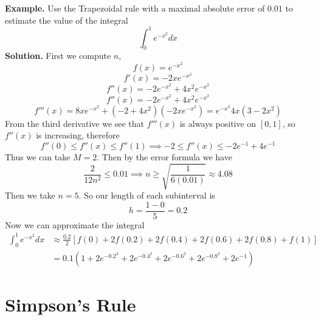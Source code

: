 \documentclass[openany]{report}
\begin{document}
\textbf{Example.} Use the Trapezoidal rule with a maximal absolute error of $0.01$ to estimate the value of the integral
\[\int_0^1 e^{-x^2}dx\]
\textbf{Solution.} First we compute $n$, 
\[f(x) = e^{-x^2}\]
\[f'(x) = -2xe^{-x^2}\]
\[f''(x) = -2e^{-x^2} + 4x^2e^{-x^2}\]
\[f''(x) = -2e^{-x^2} + 4x^2e^{-x^2}\]
\[f'''(x) = 8xe^{-x^2} + (-2 + 4x^2)(-2xe^{-x^2}) = e^{-x^2}4x(3-2x^2)\]
From the third derivative we see that $f'''(x)$ is always positive on $[0,1]$, so $f''(x)$ is increasing, therefore 
\[f''(0) \leq f''(x) \leq f''(1) \implies -2 \leq f''(x) \leq -2e^{-1} + 4e^{-1}\]
Thus we can take $M =2$. Then by the error formula we have
\[\frac{2}{12n^2} \leq 0.01 \implies n \geq \sqrt{\frac{1}{6(0.01)}} \approx 4.08\]
Then we take $n = 5$. So our length of each subinterval is
\[h = \frac{1 -0}{5} = 0.2\]
Now we can approximate the integral 
\begin{align*}
    \int_0^1 e^{-x^2}dx &\approx \frac{0.2}{2}\left[f(0) + 2f(0.2) + 2f(0.4) +2f(0.6) + 2f(0.8) + f(1)\right]\\
    &=0.1\left(1 + 2e^{-0.2^2} + 2e^{-0.4^2} + 2e^{-0.6^2} + 2e^{-0.8^2} + 2e^{-1}\right)
\end{align*}

\section{Simpson's Rule}
\end{document}
